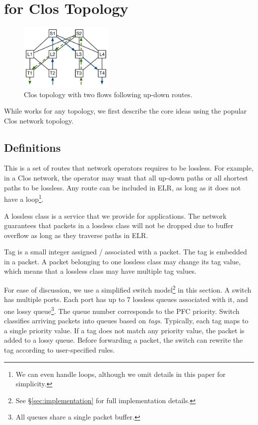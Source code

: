 \section{\sysname{} for Clos Topology}
\label{sec:specific}

\begin{figure}[t]
		\centering
		\includegraphics[width=0.4\textwidth] {figs/updown_paths}
		\caption{Clos topology with two flows following up-down routes.}
		\label{fig:basic_clos}
\end{figure}

While \sysname{} works for any topology, we first describe the core ideas using
the popular Clos network topology.

\subsection {Definitions}

 This is a set of routes that network
operators requires to be lossless. For example, in a Clos network, the operator
may want that all up-down paths or all shortest paths to be lossless.  Any route
can be included in ELR, as long as it does not have a loop\footnote{We can even
handle loops, although we omit details in this paper for simplicity.}.

 A lossless class is a service that we provide for
applications. The network guarantees that packets in a lossless class will not
be dropped due to buffer overflow as long as they traverse paths in ELR.

 Tag is a small integer assigned / associated with a packet. The tag
is embedded in a packet. A packet belonging to one lossless class may change its
tag value, which means that a lossless class may have multiple tag values.

 For ease of discussion, we use a simplified
switch model\footnote{See \S\ref{sec:implementation} for full implementation
details.} in this section.  A switch has multiple ports. Each port has up to 7
lossless queues associated with it, and one lossy queue\footnote{All queues
share a single packet buffer.}. The queue number corresponds to the PFC priority.
Switch classifies arriving packets into queues based on {\em tags}.  Typically,
each tag maps to a single priority value. If a tag does not match any priority
value, the packet is added to a lossy queue. Before forwarding a packet, the
switch can rewrite the tag according to user-specified rules.

